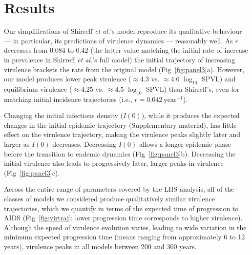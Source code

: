 \documentclass[10pt,letterpaper]{article}
\renewcommand{\figurename}{Fig}
\newcommand{\Lspvl}{$\log_{10}$ SPVL}
\newcommand{\etal}{\textit{et al.}}
\begin{document}
\section*{Results}

Our simplifications of Shirreff \etal's model \cite{shirreff_transmission_2011} reproduce its qualitative behaviour --- in particular, its predictions of virulence dynamics --- reasonably well. As $r$ decreases from 0.084 to 0.42 (the latter value matching the initial rate of increase in prevalence in Shirreff \etal's full model) the initial trajectory of increasing virulence brackets the rate from the original model (\figurename~\ref{fig:panel3}a). However, our model produces lower peak virulence ($\approx 4.3$ vs. $\approx 4.6$ \Lspvl) 
and equilibrium virulence ($\approx 4.25$ vs. $\approx 4.5$ \Lspvl) than Shirreff's, even for matching initial incidence trajectories (i.e., $r=0.042~\textrm{year}^{-1}$).

Changing the initial infectious density ($I(0)$), while it produces the expected changes in the initial epidemic trajectory (Supplementary material), has little effect on the virulence trajectory, making the virulence peaks slightly later and larger as $I(0)$ decreases. Decreasing $I(0)$ allows a longer epidemic phase before the transition to endemic dynamics (\figurename~\ref{fig:panel3}b). Decreasing the initial virulence
also leads to progressively later, larger peaks in virulence (\figurename~\ref{fig:panel3}c).

Across the entire range of parameters covered by the LHS analysis, all of the classes of models we considered produce qualitatively similar virulence trajectories, which we quantify in terms of the expected time of progression
to AIDS (\figurename~\ref{fig:virtraj}: lower progression time corresponds
to higher virulence). Although the speed of virulence evolution varies, leading to wide variation in the minimum expected progression time (means ranging from approximately 6 to 12 years), virulence peaks in all models between 200 and 300 years.
\end{document}
